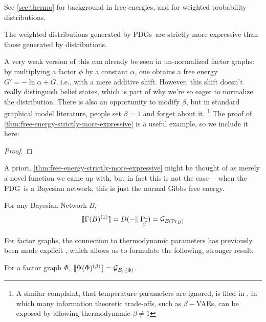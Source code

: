 \documentclass{article}
\newcommand\MaxEnt{{\overset{\uparrow}{\mathbf H}}}
\newcommand{\MN}{PDG}
\newcommand{\MNs}{\MN s}
\begin{document}
	See \ref{sec:thermo} for background in free energies, and \cite{} for weighted probability distributions.
	
	\begin{theorem}\label{thm:free-energy-strictly-more-expressive}
	 	The weighted distributions generated by \MNs\ are strictly more expressive than those generated by distributions.
	\end{theorem}
	
	A very weak version of this can already be seen in un-normalized factor graphs: by multiplying a factor $\phi$ by a constant $\alpha$, one obtains a free energy $G' = - \ln \alpha + G$, i.e., with a mere additive shift. However, this shift doesn't really distinguish belief states, which is part of why we're so eager to normalize the distribution.
	There is also an opportunity to modify $\beta$, but in standard graphical model literature, people set $\beta = 1$ and forget about it.%
		\footnote{A similar complaint, that temperature parameters are ignored, is filed in \cite{fixing-a-broken-elbo}, in which many information theoretic trade-offs, such as $\beta-$VAEs, can be exposed by allowing thermodynamic $\beta \neq 1$}
	The proof of \cref{thm:free-energy-strictly-more-expressive} is a useful example, so we include it here:

	\begin{proof}
		\todo{case where $\bbr{M}_\MaxEnt = \bbr{M'}_\MaxEnt$ but $\bbr{M} \neq \bbr{M'}$}
		
		
	\end{proof}

	A priori, \cref{thm:free-energy-strictly-more-expressive} might be thought of as merely a novel function we came up with, but in fact this is not the case--- when the \MN\ is a Bayesian network, this is just the normal Gibbs free energy.

	\begin{conj}
		For any Bayesian Network $B$, 
		$$\llbracket\Gamma(B)^{(1)}\rrbracket = D(- || \Pr_\beta) = \mathcal G_{E(\Pr_B)}$$
	\end{conj}
	
	For factor graphs, the connection to thermodynamic parameters has previously been made explicit \cite{}, which allows us to formulate the following, stronger result:
	
	\begin{conj}
		For a factor graph $\Phi$, $\llbracket\Psi(\Phi)^{(\beta)}\rrbracket = \mathcal G_{E_\beta(\Phi)}$.
	\end{conj}
\end{document}
